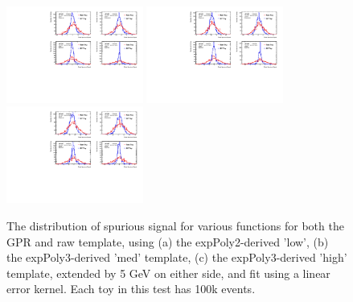 \begin{figure} 
\begin{center}
  \includegraphics[width=0.4\textwidth]{figures/background/gpr/validation/linear/ToyTest_FitSigVals_lowpT_100k_noSig}   
  \includegraphics[width=0.4\textwidth]{figures/background/gpr/validation/linear/ToyTest_FitSigVals_medpT_100k_noSig}   
  \includegraphics[width=0.4\textwidth]{figures/background/gpr/validation/linear/ToyTest_FitSigVals_highpT_100k_noSig}   
\caption{The distribution of spurious signal for various functions for both the GPR and raw template, using (a) the expPoly2-derived 'low', (b) the expPoly3-derived 'med' template, (c) the expPoly3-derived 'high' template, extended by 5 GeV on either side, and fit using a linear error kernel. Each toy in this test has 100k events.}
\label{fig:linearkernel_lowpt_100k_noSig}
\end{center}
\end{figure}

